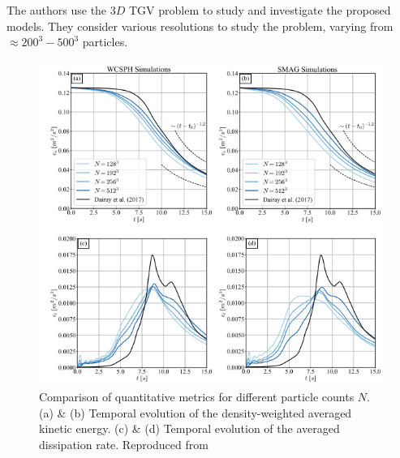 The authors use the $3D$ TGV problem to study and investigate the proposed models. They consider various resolutions to study the problem, varying from $\approx 200^3 - 500^3$ particles.
\begin{figure}[htbp!]
    \centering
    \includegraphics[scale=0.9]{Figures/research_papers/Okraschevski2022-fig-6.png}
    \caption{Comparison of quantitative metrics for different particle counts $N$. (a) \& (b) Temporal evolution of the density-weighted averaged kinetic energy. (c) \& (d) Temporal evolution of the averaged dissipation rate. Reproduced from \cite{Okraschevski2022}}
    \label{fig:Okraschevski2022-fig-6}
\end{figure}
